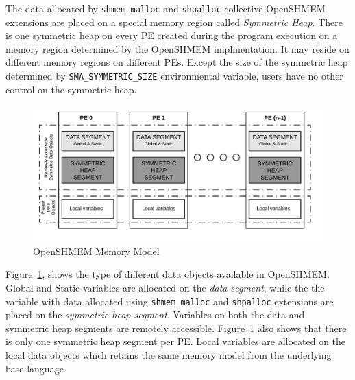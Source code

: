 The data allocated by \texttt{shmem\_malloc} and \texttt{shpalloc} collective
OpenSHMEM extensions are placed on a special memory region called \emph{Symmetric
Heap}. There is one symmetric heap on every PE created during the program execution
on a memory region determined by the OpenSHMEM implmentation. It may reside on
different memory regions on different PEs. Except the size of the symmetric heap
determined by \texttt{SMA\_SYMMETRIC\_SIZE} environmental variable, users have no
other control on the symmetric heap.

\begin{figure}[!h]
    \vspace{-20pt}
    \hspace*{5mm}
    \includegraphics[scale=0.20]{image/osm-mmodel.png}
    \vspace{-25pt}
    \caption{OpenSHMEM Memory Model}
    \label{fig:mmodel}
\end{figure}

Figure~\ref{fig:mmodel}, shows the type of different data objects available in
OpenSHMEM. Global and Static variables are allocated on the \emph{data segment},
while the the variable with data allocated using \texttt{shmem\_malloc} and
\texttt{shpalloc} extensions are placed on the \emph{symmetric heap segment}.
Variables on both the data and symmetric heap segments are remotely accessible.
Figure~\ref{fig:mmodel} also shows that there is only one symmetric heap segment
per PE. Local variables are allocated on the local data objects which retains the
same memory model from the underlying base language.

